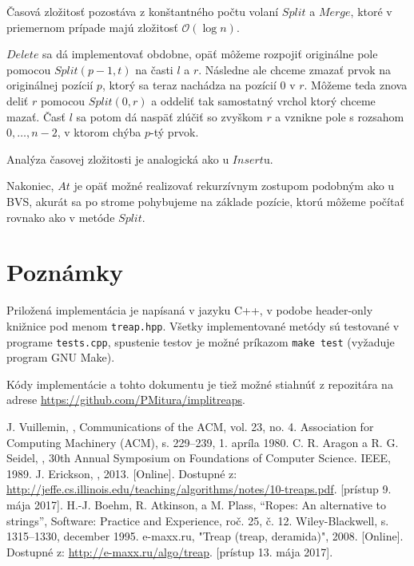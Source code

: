 \documentclass[a4paper, 12pt]{article}
\theoremstyle{definition}
\begin{document}
Časová zložitosť pozostáva z konštantného počtu volaní $Split$ a $Merge$, ktoré
v priemernom prípade majú zložitosť $\mathcal{O}(\log n)$.

\bigskip

$Delete$ sa dá implementovať obdobne, opäť môžeme rozpojiť originálne pole
pomocou $Split(p-1, t)$ na časti $l$ a $r$. Následne ale chceme zmazať prvok na
originálnej pozícií $p$, ktorý sa teraz nachádza na pozícií 0 v $r$. Môžeme
teda znova deliť $r$ pomocou $Split(0, r)$ a oddeliť tak samostatný vrchol
ktorý chceme mazať. Časť $l$ sa potom dá naspäť zlúčiť so zvyškom $r$ a vznikne
pole s rozsahom $0, \ldots, n-2$, v ktorom chýba $p$-tý prvok.

Analýza časovej zložitosti je analogická ako u $Insert$u.

\bigskip

Nakoniec, $At$ je opäť možné realizovať rekurzívnym zostupom podobným ako u
BVS, akurát sa po strome pohybujeme na základe pozície, ktorú môžeme počítať
rovnako ako v metóde $Split$.

\section{Poznámky}

Priložená implementácia je napísaná v jazyku C++, v podobe header-only knižnice
pod menom \texttt{treap.hpp}. Všetky implementované metódy sú testované v
programe \texttt{tests.cpp}, spustenie testov je možné príkazom \texttt{make
test} (vyžaduje program GNU Make).

Kódy implementácie a tohto dokumentu je tiež možné stiahnúť z repozitára na
adrese \url{https://github.com/PMitura/implitreaps}.

\begin{thebibliography}{9}
    J. Vuillemin, , Communications of
        the ACM, vol. 23, no. 4. Association for Computing Machinery (ACM), s.
        229–239, 1. apríla 1980.
    C. R. Aragon a R. G. Seidel, , 30th Annual
        Symposium on Foundations of Computer Science. IEEE, 1989.
    J. Erickson, , 2013. [Online]. Dostupné
        z:
        \url{http://jeffe.cs.illinois.edu/teaching/algorithms/notes/10-treaps.pdf}.
        [prístup 9. mája 2017].
    H.-J. Boehm, R. Atkinson, a M. Plass, “Ropes: An alternative to strings”,
        Software: Practice and Experience, roč. 25, č. 12. Wiley-Blackwell, s.
        1315–1330, december 1995.
    e-maxx.ru, "Treap (treap, deramida)", 2008. [Online]. Dostupné z:
        \url{http://e-maxx.ru/algo/treap}. [prístup 13. mája 2017].
\end{thebibliography}
\end{document}
